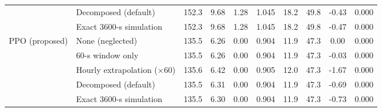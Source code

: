 \begin{table}[!t]
\begin{tabular}{llcccccccc}
& Decomposed (default) & 152.3 & 9.68 & 1.28 & 1.045 & 18.2 & 49.8 & -0.43 & 0.000 \\
& Exact 3600-s simulation & 152.3 & 9.68 & 1.28 & 1.045 & 18.2 & 49.8 & -0.47 & 0.000 \\
\midrule
\multirow{5}{*}{PPO (proposed)} & None (neglected) & 135.5 & 6.26 & 0.00 & 0.904 & 11.9 & 47.3 & 0.00 & 0.000 \\
& 60-s window only & 135.5 & 6.26 & 0.00 & 0.904 & 11.9 & 47.3 & -0.03 & 0.000 \\
& Hourly extrapolation ($\times 60$) & 135.6 & 6.42 & 0.00 & 0.905 & 12.0 & 47.3 & -1.67 & 0.000 \\
& Decomposed (default) & 135.5 & 6.31 & 0.00 & 0.904 & 11.9 & 47.3 & -0.69 & 0.000 \\
& Exact 3600-s simulation & 135.5 & 6.30 & 0.00 & 0.904 & 11.9 & 47.3 & -0.73 & 0.000 \\
\bottomrule
\end{tabular}
\end{table}
